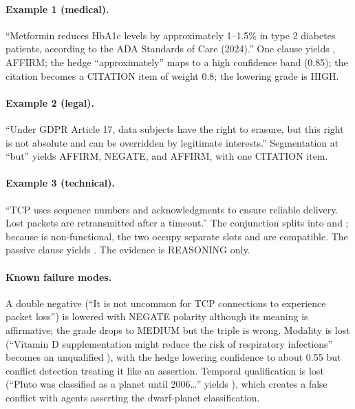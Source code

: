 \begin{sloppypar}
\paragraph{Example 1 (medical).} ``Metformin reduces HbA1c levels by approximately 1--1.5\% in type 2 diabetes patients, according to the ADA Standards of Care (2024).'' One clause yields , AFFIRM; the hedge ``approximately'' maps to a high confidence band (0.85); the citation becomes a CITATION item of weight 0.8; the lowering grade is HIGH.
\end{sloppypar}

\begin{sloppypar}
\paragraph{Example 2 (legal).} ``Under GDPR Article 17, data subjects have the right to erasure, but this right is not absolute and can be overridden by legitimate interests.'' Segmentation at ``but'' yields  AFFIRM,  NEGATE, and  AFFIRM, with one CITATION item.
\end{sloppypar}

\paragraph{Example 3 (technical).} ``TCP uses sequence numbers and acknowledgments to ensure reliable delivery. Lost packets are retransmitted after a timeout.'' The conjunction splits into  and ; because  is non-functional, the two occupy separate slots and are compatible. The passive clause yields . The evidence is REASONING only.

\paragraph{Known failure modes.} A double negative (``It is not uncommon for TCP connections to experience packet loss'') is lowered with NEGATE polarity although its meaning is affirmative; the grade drops to MEDIUM but the triple is wrong. Modality is lost (``Vitamin D supplementation might reduce the risk of respiratory infections'' becomes an unqualified ), with the hedge lowering confidence to about 0.55 but conflict detection treating it like an assertion. Temporal qualification is lost (``Pluto was classified as a planet until 2006\ldots'' yields ), which creates a false conflict with agents asserting the dwarf-planet classification.
